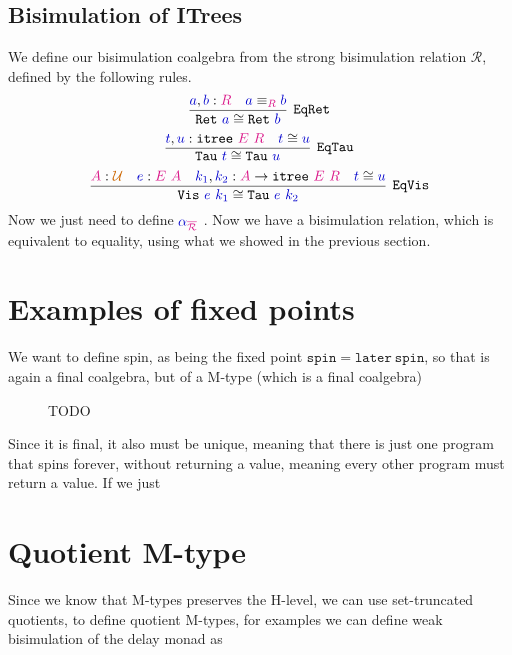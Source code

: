 \documentclass[twoside,11pt,openright]{report}
\newcommand*{\term}[1]{\textcolor{blue!80!black}{#1}}
\newcommand*{\type}[1]{\textcolor{magenta!90!black}{#1}}
\newcommand*{\universe}[1]{\textcolor{orange!80!black}{#1}}
\begin{document}
\subsection{Bisimulation of ITrees}
We define our bisimulation coalgebra from the strong bisimulation relation \(\mathcal{R}\), defined by the following rules.
\begin{equation}
  \infer[\mathtt{EqRet}]{\mathtt{Ret}~\term{a} \cong \mathtt{Ret}~\term{b}}{\term{a},\term{b} : \type{R} & \term{a} \equiv_{\type{R}} \term{b}}
\end{equation}
\begin{equation}
  \infer[\mathtt{EqTau}]{\mathtt{Tau}~\term{t} \cong \mathtt{Tau}~\term{u}}{\term{t},\term{u} : \mathtt{itree}~\type{E}~\type{R} & \term{t} \cong \term{u}}
\end{equation}
\begin{equation}
  \infer[\mathtt{EqVis}]{\mathtt{Vis}~\term{e}~\term{k_1} \cong \mathtt{Tau}~\term{e}~\term{k_2}}{\type{A} : \universe{\mathcal{U}} & \term{e} : \type{E}~\type{A} & \term{k_1},\term{k_2} : \type{A} \rightarrow \mathtt{itree}~\type{E}~\type{R} & \term{t} \cong \term{u}}
\end{equation}
Now we just need to define \(\term{\alpha}_{\type{\overline{\mathcal{R}}}}\) . Now we have a bisimulation relation, which is equivalent to equality, using what we showed in the previous section.

\section{Examples of fixed points}
We want to define spin, as being the fixed point \(\mathtt{spin} = \mathtt{later}~\mathtt{spin}\), so that is again a final coalgebra, but of a M-type (which is a final coalgebra)

\begin{figure}[h]
  \centering
  \caption{TODO}
\end{figure}
\noindent Since it is final, it also must be unique, meaning that there is just one program that spins forever, without returning a value, meaning every other program must return a value. If we just

\section{Quotient M-type}
Since we know that M-types preserves the H-level, we can use set-truncated quotients, to define quotient M-types, for examples we can define weak bisimulation of the delay monad as
\[\]
\end{document}
